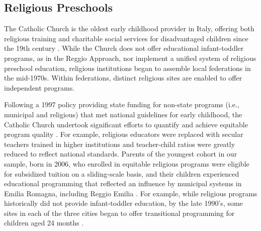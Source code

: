 \subsection{Religious Preschools}

The Catholic Church is the oldest early childhood provider in Italy, offering both religious training and charitable social services for disadvantaged children since the 19th century \citep{OECD_2001_Italy-Country-Note}. While the Church does not offer educational infant-toddler programs, as in the Reggio Approach, nor implement a unified system of religious preschool education, religious institutions began to assemble local federations in the mid-1970s. Within federations, distinct religious sites are enabled to offer independent programs.


Following a 1997 policy providing state funding for non-state programs (i.e., municipal and religious) that met national guidelines for early childhood, the Catholic Church undertook significant efforts to quantify and achieve equitable program quality \citep{Malizia-Cicatelli_2011_BOOK_Catholic-School}. For example, religious educators were replaced with secular teachers trained in higher institutions and teacher-child ratios were greatly reduced to reflect national standards. Parents of the youngest cohort in our sample, born in 2006, who enrolled in equitable religious programs were eligible for subsidized tuition on a sliding-scale basis, and their children experienced educational programming that reflected an influence by municipal systems in Emilia Romagna, including Reggio Emilia \citep{Hohnerlein_2009_Paradox-Public-Preschools,OECD_2001_Italy-Country-Note}. For example, while religious programs historically did not provide infant-toddler education, by the late 1990's, some sites in each of the three cities began to offer transitional programming for children aged 24 months \citep{Malizia-Cicatelli_2011_BOOK_Catholic-School,CEHD_2016_Historical-Analysis}.


